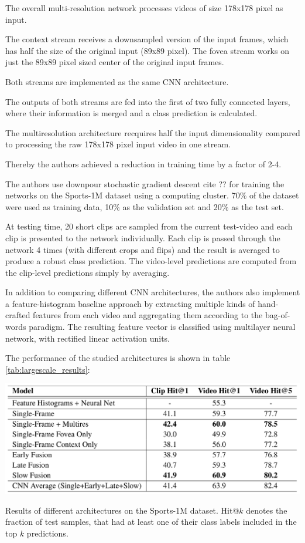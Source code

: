 The overall multi-resolution network processes videos of size 178x178 pixel as input.

The context stream receives a downsampled version of the input frames, which has half the size of the original input (89x89 pixel).
The fovea stream works on just the 89x89 pixel sized center of the original input frames.

Both streams are implemented as the same CNN architecture.

The outputs of both streams are fed into the first of two fully connected layers, where their information is merged and a class prediction is calculated.

The multiresolution architecture recquires half the input dimensionality compared to processing the raw 178x178 pixel input video in one stream.

Thereby the authors achieved a reduction in training time by a factor of 2-4.

The authors use downpour stochastic gradient descent cite ?? for training the networks on the Sports-1M dataset using a computing cluster.
70\% of the dataset were used as training data, 10\% as the validation set and 20\% as the test set.

At testing time, 20 short clips are sampled from the current test-video and each clip is presented to the network individually.
Each clip is passed through the network 4 times (with different crops and flips) and the result is averaged to produce a robust class prediction.
The video-level predictions are computed from the clip-level predictions simply by averaging.

In addition to comparing different CNN architectures, the authors also implement a feature-histogram baseline approach by extracting multiple kinds of hand-crafted features from each video and aggregating them according to the bag-of-words paradigm.
The resulting feature vector is classified using multilayer neural network, with rectified linear activation units.

The performance of the studied architectures is shown in table \ref{tab:largescale_results}:

\begin{table}
    \centering
    \includegraphics{img_deep/largescale_results}
    \caption{Results of different architectures on the Sports-1M dataset. Hit@$k$ denotes the fraction of test samples, that had at least one of their class labels included in the top $k$ predictions. \cite{karpathy_large-scale_2014}}
    \label{tab:largescale_results}
\end{table}

